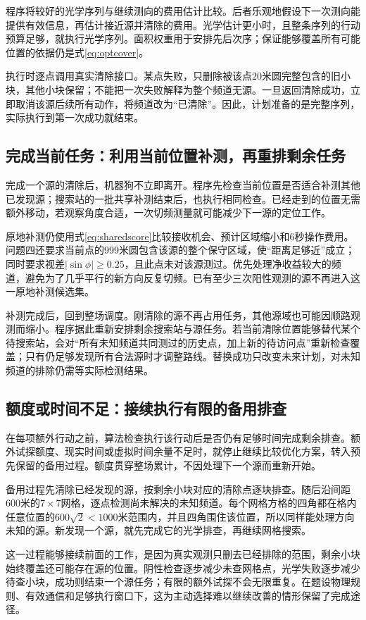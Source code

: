 \documentclass[UTF8,a4paper,12pt,fontset=fandol]{ctexart}
\begin{document}
程序将较好的光学序列与继续测向的费用估计比较。后者乐观地假设下一次测向能提供有效信息，再估计接近源并清除的费用。光学估计更小时，且整条序列的行动预算足够，就执行光学序列。面积权重用于安排先后次序；保证能够覆盖所有可能位置的依据仍是式\eqref{eq:optcover}。

执行时逐点调用真实清除接口。某点失败，只删除被该点20米圆完整包含的旧小块，其他小块保留；不能把一次失败解释为整个频道无源。一旦返回清除成功，立即取消该源后续所有动作，将频道改为“已清除”。因此，计划准备的是完整序列，实际执行到第一次成功就结束。

\subsection{完成当前任务：利用当前位置补测，再重排剩余任务}
完成一个源的清除后，机器狗不立即离开。程序先检查当前位置是否适合补测其他已发现源；搜索站的一批共享补测结束后，也执行相同检查。已经走到的位置无需额外移动，若观察角度合适，一次切频测量就可能减少下一源的定位工作。

原地补测仍使用式\eqref{eq:sharedscore}比较接收机会、预计区域缩小和6秒操作费用。问题四还要求当前点的999米圆包含该源的整个保守区域，使“距离足够近”成立；同时要求视差$|\sin\phi|\ge0.25$，且此点未对该源测过。优先处理净收益较大的频道，避免为了几乎平行的新方向反复切频。已有至少三次阳性观测的源不再进入这一原地补测候选集。

补测完成后，回到整场调度。刚清除的源不再占用任务，其他源域也可能因顺路观测而缩小。程序据此重新安排剩余搜索站与源任务。若当前清除位置能够替代某个待搜索站，会对“所有未知频道共同测过的历史点，加上新的待访问点”重新检查覆盖；只有仍足够发现所有合法源时才调整路线。替换成功只改变未来计划，对未知频道的排除仍需等实际检测结果。

\subsection{额度或时间不足：接续执行有限的备用排查}
在每项额外行动之前，算法检查执行该行动后是否仍有足够时间完成剩余排查。额外试探额度、现实时间或虚拟时间余量不足时，就停止继续比较优化方案，转入预先保留的备用过程。额度贯穿整场累计，不因处理下一个源而重新开始。

备用过程先清除已经发现的源，按剩余小块对应的清除点逐块排查。随后沿间距600米的$7\times7$网格，逐点检测尚未解决的未知频道。每个网格方格的四角都在格内任意位置的$600\sqrt2<1000$米范围内，并且四角围住该位置，所以同样能处理方向未知的源。新发现一个源，就先完成它的光学排查，再继续网格搜索。

这一过程能够接续前面的工作，是因为真实观测只删去已经排除的范围，剩余小块始终覆盖还可能存在源的位置。阴性检查逐步减少未查网格点，光学失败逐步减少待查小块，成功则结束一个源任务；有限的额外试探不会无限重复。在题设物理规则、有效通信和足够执行窗口下，这为主动选择难以继续改善的情形保留了完成途径。
\end{document}
